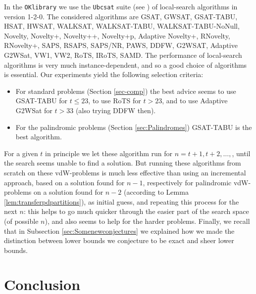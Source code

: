 \documentclass[final,3p,times]{elsarticle}
\theoremstyle{definition}
\renewcommand{\leq}{\le} %
\newcommand{\OKlibrary}{\texttt{OKlibrary}}
\begin{document}
In the \OKlibrary{} we use the \texttt{Ubcsat} suite (see \cite{ubcsat}) of local-search algorithms in version 1-2-0. The considered algorithms are GSAT, GWSAT, GSAT-TABU, HSAT, HWSAT, WALKSAT, WALKSAT-TABU, WALKSAT-TABU-NoNull, Novelty, Novelty+, Novelty++, Novelty+p, Adaptive Novelty+, RNovelty, RNovelty+, SAPS, RSAPS, SAPS/NR, PAWS, DDFW, G2WSAT, Adaptive G2WSat, VW1, VW2, RoTS, IRoTS, SAMD. The performance of local-search algorithms is very much instance-dependent, and so a good choice of algorithms is essential. Our experiments yield the following selection criteria:
\begin{itemize}
\item For standard problems (Section \ref{sec-comp}) the best advice seems to use GSAT-TABU for $t \leq 23$, to use RoTS for $t > 23$, and to use Adaptive G2WSat for $t > 33$ (also trying DDFW then).
\item For the palindromic problems (Section \ref{sec:Palindromes}) GSAT-TABU is the best algorithm.
\end{itemize}
For a given $t$ in principle we let these algorithm run for $n=t+1,t+2, \dots, $, until the search seems unable to find a solution. But running these algorithms from scratch on these vdW-problems is much less effective than using an incremental approach, based on a solution found for $n-1$, respectively for palindromic vdW-problems on a solution found for $n-2$ (according to Lemma \ref{lem:transferpdpartitions}), as initial guess, and repeating this process for the next $n$: this helps to go much quicker through the easier part of the search space (of possible $n$), and also seems to help for the harder problems. Finally, we recall that in Subsection \ref{sec:Somenewconjectures} we explained how we made the distinction between lower bounds we conjecture to be exact and sheer lower bounds.


\section{Conclusion}
\label{sec:Conclusion}
\end{document}
